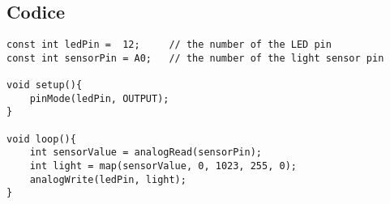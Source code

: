 \subsection{Codice}
\begin{lstlisting}[frame=single, language=Arduino]
const int ledPin =  12;     // the number of the LED pin
const int sensorPin = A0;   // the number of the light sensor pin

void setup(){
    pinMode(ledPin, OUTPUT);
}

void loop(){
    int sensorValue = analogRead(sensorPin);
    int light = map(sensorValue, 0, 1023, 255, 0);
    analogWrite(ledPin, light);
}
\end{lstlisting}